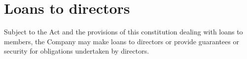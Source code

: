 \section{Loans to directors}

Subject to the Act and the provisions of this constitution dealing with loans to members, the Company may make loans to directors or provide guarantees or security for obligations undertaken by directors. 